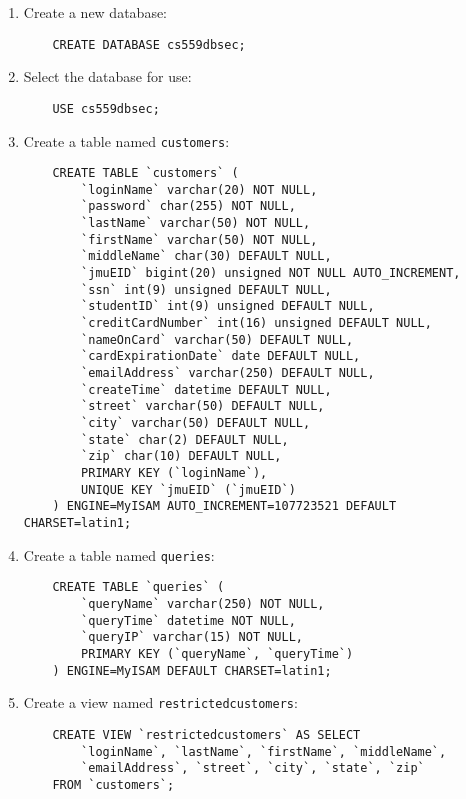 \documentclass{article}
\begin{document}
\begin{enumerate}
    \item Create a new database:
    \begin{verbatim}
    CREATE DATABASE cs559dbsec;
    \end{verbatim}

    \item Select the database for use:
    \begin{verbatim}
    USE cs559dbsec;
    \end{verbatim}

    \item Create a table named \texttt{customers}:
    \begin{verbatim}
    CREATE TABLE `customers` (
        `loginName` varchar(20) NOT NULL,
        `password` char(255) NOT NULL,
        `lastName` varchar(50) NOT NULL,
        `firstName` varchar(50) NOT NULL,
        `middleName` char(30) DEFAULT NULL,
        `jmuEID` bigint(20) unsigned NOT NULL AUTO_INCREMENT,
        `ssn` int(9) unsigned DEFAULT NULL,
        `studentID` int(9) unsigned DEFAULT NULL,
        `creditCardNumber` int(16) unsigned DEFAULT NULL,
        `nameOnCard` varchar(50) DEFAULT NULL,
        `cardExpirationDate` date DEFAULT NULL,
        `emailAddress` varchar(250) DEFAULT NULL,
        `createTime` datetime DEFAULT NULL,
        `street` varchar(50) DEFAULT NULL,
        `city` varchar(50) DEFAULT NULL,
        `state` char(2) DEFAULT NULL,
        `zip` char(10) DEFAULT NULL,
        PRIMARY KEY (`loginName`),
        UNIQUE KEY `jmuEID` (`jmuEID`)
    ) ENGINE=MyISAM AUTO_INCREMENT=107723521 DEFAULT CHARSET=latin1;
    \end{verbatim}

    \item Create a table named \texttt{queries}:
    \begin{verbatim}
    CREATE TABLE `queries` (
        `queryName` varchar(250) NOT NULL,
        `queryTime` datetime NOT NULL,
        `queryIP` varchar(15) NOT NULL,
        PRIMARY KEY (`queryName`, `queryTime`)
    ) ENGINE=MyISAM DEFAULT CHARSET=latin1;
    \end{verbatim}

    \item Create a view named \texttt{restrictedcustomers}:
    \begin{verbatim}
    CREATE VIEW `restrictedcustomers` AS SELECT
        `loginName`, `lastName`, `firstName`, `middleName`,
        `emailAddress`, `street`, `city`, `state`, `zip`
    FROM `customers`;
    \end{verbatim}


\end{enumerate}
\end{document}
